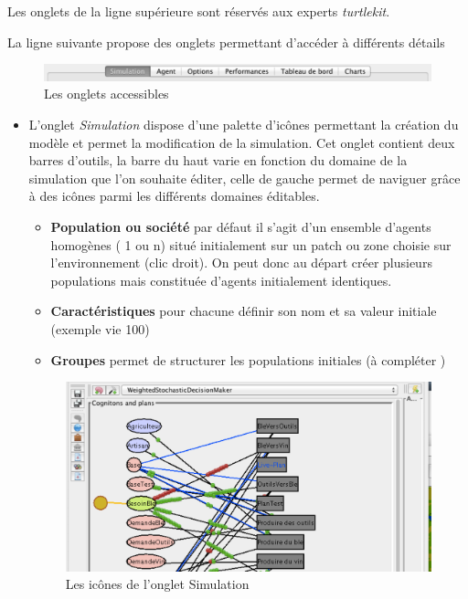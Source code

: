 \documentclass[a4paper,oneside,12 pt]{article}
\begin{document}
Les onglets de la ligne supérieure sont réservés aux experts \textit{turtlekit}.
\newpage



La ligne suivante propose des onglets permettant d'accéder à différents détails 
\begin{figure}[hbtp]
\begin{center}
 \includegraphics [scale=0.5] {Onglets.pdf}
\end{center}
 \caption{Les onglets accessibles }
\end{figure}


\begin{itemize}
\item L'onglet\textit{ Simulation} dispose d'une palette d'icônes permettant la création du modèle et permet la modification de la simulation.
Cet onglet contient deux barres d’outils, la barre du haut varie en fonction du domaine de la simulation que l’on souhaite éditer, celle de gauche permet de naviguer grâce à des icônes parmi les différents domaines éditables.
\begin{itemize}
\item \textbf{Population ou société}
par défaut il s'agit d'un ensemble d'agents homogènes ( 1 ou n) situé initialement sur un patch ou zone choisie sur l'environnement (clic droit). On peut donc au départ créer plusieurs populations mais constituée d'agents initialement identiques.
\item \textbf{Caractéristiques}
pour chacune définir son nom et sa valeur initiale (exemple  vie 100)
\item \textbf{Groupes}
permet de structurer les populations initiales (à compléter )
\end{itemize}

\begin{figure}[hbtp]
\begin{center}
 \includegraphics [scale=0.5] {Simul.pdf}
\end{center}
 \caption{Les icônes de l'onglet Simulation }
\end{figure}



\end{itemize}
\end{document}
